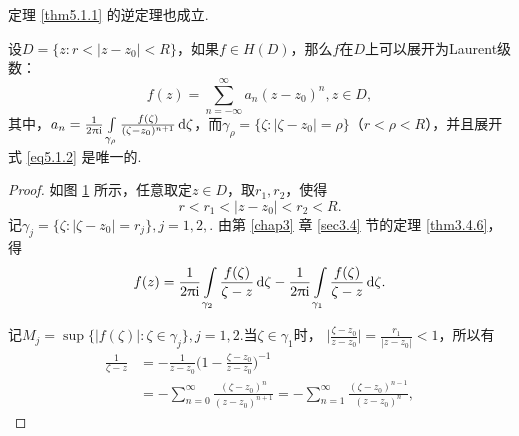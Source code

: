 定理 \ref{thm5.1.1} 的逆定理也成立.
\begin{theorem}\label{thm5.1.2}
  设$D=\{z:r<|z-z_0|<R\}$，如果$f\in H(D)$，那么$f$在$D$上可以展开为Laurent级数：
  \begin{equation}\label{eq5.1.2}
    f(z) = \sum_{n=-\infty}^\infty a_n(z-z_0)^n,z\in D,
  \end{equation}
  其中，$a_n=\frac1{2\uppi\mathrm i}\int\limits_{\gamma_\rho}\frac{f(\zeta)}{(\zeta-z_0)^{n+1}}
  \mathop{}\!\mathrm{d} \zeta$，而$\gamma_\rho=\{\zeta:|\zeta-z_0|=\rho\}$（$r<\rho<R$），并且展开式 \eqref{eq5.1.2} 是唯一的.
\end{theorem}
\begin{proof}
  如图 \ref{fig5.1} 所示，任意取定$z\in D$，取$r_1,r_2$，使得
  \[
    r < r_1 < |z - z_0| < r_2 < R.
  \]
  记$\gamma_j=\{\zeta:|\zeta-z_0|=r_j\},j=1,2,$. 由第 \ref{chap3} 章 \ref{sec3.4} 节的定理 \ref{thm3.4.6}，得
  \begin{equation}\label{eq5.1.3}
    f(z) = \frac1{2\uppi\mathrm i}\int\limits_{\gamma_2}\frac{f(\zeta)}{\zeta-z}\mathop{}\!\mathrm{d} \zeta-
    \frac1{2\uppi\mathrm i}\int\limits_{\gamma_1}\frac{f(\zeta)}{\zeta-z}\mathop{}\!\mathrm{d} \zeta.
  \end{equation}
  \begin{figure}[!ht]
    \centering
    \caption{\label{fig5.1}}
  \end{figure}
  记$M_j=\sup\{|f(\zeta)|:\zeta\in\gamma_j\},j=1,2$.当$\zeta\in\gamma_1$时，
  $\bigg|\frac{\zeta-z_0}{z-z_0}\bigg|=\frac{r_1}{|z-z_0|}<1$，所以有
  \begin{align*}
    \frac1{\zeta-z} & = -\frac1{z-z_0} \bigg(1-\frac{\zeta-z_0}{z-z_0} \bigg)^{-1}\\
    & = -\sum_{n=0}^\infty\frac{(\zeta-z_0)^n}{(z-z_0)^{n+1}}=-
     \sum_{n=1}^\infty\frac{(\zeta-z_0)^{n-1}}{(z-z_0)^{n}},
  \end{align*}

\end{proof}
